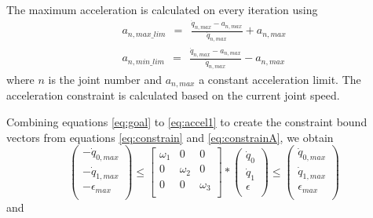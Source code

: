  The maximum acceleration is calculated on every iteration using
 \begin{subequations}
 	\begin{align}
 		a_{n,max\_lim}\ \ =\ \ \frac{\dot{q}_{n,max} - a_{n,max}}{\dot{q}_{n,max}} + a_{n,max} \\
 		a_{n,min\_lim}\ \ =\ \ \frac{\dot{q}_{n,max} - a_{n,max}}{\dot{q}_{n,max}} - a_{n,max}
 	\end{align}
 	\label{eq:accel}
 \end{subequations}
where $n$ is the joint number and $a_{n,max}$ a constant acceleration limit. The acceleration constraint is calculated based on the current joint speed.

Combining equations \ref{eq:goal} to \ref{eq:accel1} to create the constraint bound vectors from equations \ref{eq:constrain} and \ref{eq:constrainA}, we obtain
\begin{equation}
\left( \begin{array}{c}
-\dot{q}_{0,max} \\
-\dot{q}_{1,max} \\
-\epsilon_{max} \\
\end{array}
\right)	\leq 
\left[ \begin{array}{cccc}
\omega_{1} & 0 & 0 \\
0 & \omega_{2} & 0 \\
0 & 0 & \omega_{3} \\
\end{array}
\right] *
\left( \begin{array}{c}
\dot{q}_{0} \\
\dot{q}_{1} \\
\epsilon \\
\end{array}
\right) 
\leq \left( \begin{array}{c}
\dot{q}_{0,max} \\
\dot{q}_{1,max} \\
\epsilon_{max} \\
\end{array}
\right)
\label{eq:state_constr}
\end{equation}
and \\
